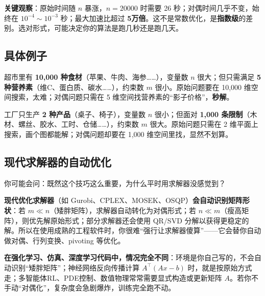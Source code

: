 \begin{insightbox}
\textbf{关键观察}：原始时间随 $n$ 暴涨，$n = 20000$ 时需要 26 秒；对偶时间几乎不变，始终在 $10^{-4} \sim 10^{-3}$ 秒；最大加速比超过 \textbf{5万倍}。这不是常数优化，是\textbf{指数级}的差别。选对形式，可能决定你的算法是跑几秒还是跑几天。
\end{insightbox}

\subsection{具体例子}

\begin{example}[超市配餐问题]
超市里有 \textbf{10,000 种食材}（苹果、牛肉、海参……），变量数 $n$ 很大；但只需满足 \textbf{5 种营养素}（维C、蛋白质、碳水……），约束数 $m$ 很小。原始问题要在 10,000 维空间搜索，太难；对偶问题只需在 5 维空间找营养素的“影子价格”，\textbf{秒解}。
\end{example}

\begin{example}[工厂排产问题]
工厂只生产 \textbf{2 种产品}（桌子、椅子），变量数 $n$ 很小；但面对 \textbf{1,000 条限制}（木材、螺丝、胶水、工时、仓储……），约束数 $m$ 很大。原始问题只需在 2 维平面上搜索，画个图都能解；对偶问题却要在 1,000 维空间里找，显然不划算。
\end{example}

\subsection{现代求解器的自动优化}

你可能会问：既然这个技巧这么重要，为什么平时用求解器没感觉到？

\begin{tcolorbox}[colback=green!5, colframe=green!60!black, title=好消息]
\textbf{现代优化求解器}（如 Gurobi、CPLEX、MOSEK、OSQP）\textbf{会自动识别矩阵形状}：若 $m \ll n$（矮胖矩阵），求解器自动转化为对偶形式；若 $n \ll m$（瘦高矩阵），则优先解原始形式；部分求解器还会使用 QR/SVD 分解以获得更稳定的解。所以在使用成熟的工程软件时，你很难“强行让求解器傻算”——它会替你自动做对偶、行列变换、pivoting 等优化。
\end{tcolorbox}

\begin{tcolorbox}[colback=orange!5, colframe=orange!80!black, title=但是...]
\textbf{在强化学习、仿真、深度学习代码中，情况完全不同}：环境是你自己写的，不会自动识别“矮胖矩阵”；神经网络反向传播计算 $A^\top(Ax - b)$ 时，就是按原始方式走；多智能体RL、PDE控制、数值物理常常需要显式构造或更新矩阵 $A$。若你不手动“对偶化”，复杂度会急剧爆炸，训练完全跑不动。
\end{tcolorbox}

